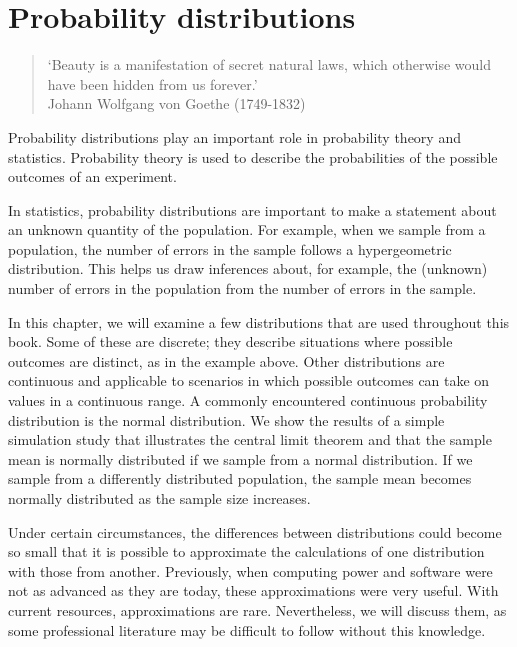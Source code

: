 \chapter{Probability distributions} %
\label{cha:probability_distributions}

\begin{quote}
`Beauty is a manifestation of secret natural laws, which otherwise would have been hidden from us forever.'\\
Johann Wolfgang von Goethe (1749-1832)
\end{quote}



Probability distributions play an important role in probability theory and statistics. Probability theory is used to describe the probabilities of the possible outcomes of an experiment.

In statistics, probability distributions are important to make a statement about an unknown quantity of the population. For example, when we sample from a population, the number of errors in the sample follows a hypergeometric distribution. This helps us draw inferences about, for example, the (unknown) number of errors in the population from the number of errors in the sample. 

In this chapter, we will examine a few distributions that are used throughout this book. Some of these are discrete; they describe situations where possible outcomes are distinct, as in the example above. Other distributions are continuous and applicable to scenarios in which possible outcomes can take on values in a continuous range. A commonly encountered continuous probability distribution is the normal distribution. We show the results of a simple simulation study that illustrates the central limit theorem and that the sample mean is normally distributed if we sample from a normal distribution. If we sample from a differently distributed population, the sample mean becomes normally distributed as the sample size increases. 

Under certain circumstances, the differences between distributions could become so small that it is possible to approximate the calculations of one distribution with those from another. Previously, when computing power and software were not as advanced as they are today, these approximations were very useful. With current resources, approximations are rare. Nevertheless, we will discuss them, as some professional literature may be difficult to follow without this knowledge.

